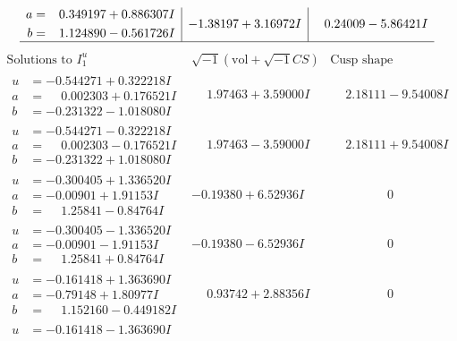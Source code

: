\documentclass[1p]{elsarticle_modified}
\theoremstyle{definition}
\newcommand{\I}{\sqrt{-1}}
\begin{document}
$$\begin{array}{c|c|c}
\begin{aligned}
a &= \phantom{-}0.349197 + 0.886307 I \\
b &= \phantom{-}1.124890 - 0.561726 I\end{aligned}
 & -1.38197 + 3.16972 I & \phantom{-}0.24009 - 5.86421 I\\
 \hline 
 \end{array}$$\newpage$$\begin{array}{c|c|c}  
\text{Solutions to }I^u_{1}& \I (\text{vol} + \sqrt{-1}CS) & \text{Cusp shape}\\
 \hline 
\begin{aligned}
u &= -0.544271 + 0.322218 I \\
a &= \phantom{-}0.002303 + 0.176521 I \\
b &= -0.231322 - 1.018080 I\end{aligned}
 & \phantom{-}1.97463 + 3.59000 I & \phantom{-}2.18111 - 9.54008 I \\ \hline\begin{aligned}
u &= -0.544271 - 0.322218 I \\
a &= \phantom{-}0.002303 - 0.176521 I \\
b &= -0.231322 + 1.018080 I\end{aligned}
 & \phantom{-}1.97463 - 3.59000 I & \phantom{-}2.18111 + 9.54008 I \\ \hline\begin{aligned}
u &= -0.300405 + 1.336520 I \\
a &= -0.00901 + 1.91153 I \\
b &= \phantom{-}1.25841 - 0.84764 I\end{aligned}
 & -0.19380 + 6.52936 I & \phantom{-0.000000 } 0 \\ \hline\begin{aligned}
u &= -0.300405 - 1.336520 I \\
a &= -0.00901 - 1.91153 I \\
b &= \phantom{-}1.25841 + 0.84764 I\end{aligned}
 & -0.19380 - 6.52936 I & \phantom{-0.000000 } 0 \\ \hline\begin{aligned}
u &= -0.161418 + 1.363690 I \\
a &= -0.79148 + 1.80977 I \\
b &= \phantom{-}1.152160 - 0.449182 I\end{aligned}
 & \phantom{-}0.93742 + 2.88356 I & \phantom{-0.000000 } 0 \\ \hline\begin{aligned}
u &= -0.161418 - 1.363690 I \\

\end{aligned}
\end{array}$$
\end{document}
